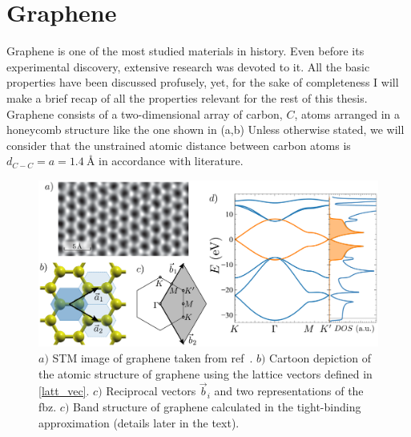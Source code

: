 \chapter{Graphene}
\label{ch:graphene}

%
%


Graphene is one of the most studied materials in history\cite{KatsnelsonBook, Geim2007, Murakami2009, CastroNeto2009a,
Mas-Balleste2011, Konschuh2011a, Cooper2012, Han2014, Sadurni2014, Rozhkov2016}.
Even before its experimental discovery\cite{Novoselov2004, Novoselov2005},
extensive research was devoted to it\cite{Wallace1947, VanBommel1975, Semenoff1984, Haldane1988, Forbeaux1998, Oshima2000}.
All the basic properties have been discussed profusely, yet, for the sake of completeness I will make a brief recap of all the properties relevant for the rest of this thesis.\\

Graphene consists of a two-dimensional array of carbon, $C$, atoms arranged in a honeycomb structure\cite{Huang2011} %
like the one shown in (a,b) %
Unless otherwise stated, we will consider that the unstrained atomic distance between carbon atoms is $d_{C-C}=a=\SI{1.4}{\angstrom}$ in accordance with literature\cite{KatsnelsonBook, Cooper2012, Ishigami2007}. %

\begin{figure}[h!]
\centering
\includegraphics{graphene/figures/graphene_summary.pdf}
\vspace{-5pt}
\caption{$a)$ STM image of graphene taken from ref~\cite{Huang2011}. $b)$ Cartoon depiction of the atomic structure of graphene using the lattice vectors defined in \eqref{latt_vec}. $c)$ Reciprocal vectors $\vec{b}_i$ and two representations of the \acf{fbz}. $c)$ Band structure of graphene calculated in the tight-binding approximation (details later in the text).}
\label{graphene_summary}
\end{figure}
\FloatBarrier


